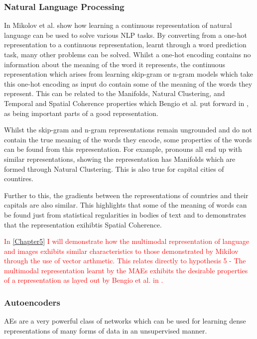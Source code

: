 \subsubsection{Natural Language Processing}
In \cite{mikolov2013distributed, mikolov2013efficient, mikolov2013linguistic} Mikolov et al. show how learning a continuous representation of natural language can be used to solve various \ac{NLP} tasks. By converting from a one-hot representation to a continuous representation, learnt through a word prediction task, many other problems can be solved. 
Whilst a one-hot encoding contains no information about the meaning of the word it represents, the continuous representation which arises from learning skip-gram or n-gram models which take this one-hot encoding as input do contain some of the meaning of the words they represent. This can be related to the Manifolds, Natural Clustering, and Temporal and Spatial Coherence properties which Bengio et al. put forward in  \cite{repRev}, as being important parts of a good representation.

Whilst the skip-gram and n-gram representations remain ungrounded and do not contain the true meaning of the words they encode, some properties of the words can be found from this representation. For example, pronouns all end up with similar representations, showing the representation has Manifolds which are formed through Natural Clustering. This is also true for capital cities of countires. 

Further to this, the gradients between the representations of countries and their capitals are also similar. This highlights that some of the meaning of words can be found just from statistical regularities in bodies of text and to demonstrates that the representation exihibtis Spatial Coherence.

\textcolor{red}{In \autoref{Chapter5} I will demonstrate how the multimodal representation of language and images exhibits similar characteristics to those demonstrated by Mikilov through the use of vector arthmetic. This relates directly to hypothesis 5 - The multimodal representation learnt by the \acp{MAE} exhibits the desirable properties of a representation as layed out by Bengio et al. in \cite{repRev}.}


\subsubsection{Autoencoders}
\acp{AE} are a very powerful class of networks which can be used for learning dense representations of many forms of data in an unsupervised manner.

